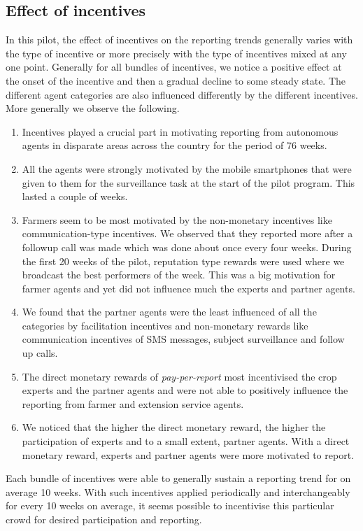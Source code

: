 \documentclass[letterpaper]{article} %
\begin{document}
\subsection{Effect of incentives}
In this pilot, the effect of incentives on the reporting trends generally varies with the type of incentive or more precisely with the type of incentives mixed at any one point. Generally for all bundles of incentives, we notice a positive effect at the onset of the incentive and then a gradual decline to some steady state. The different agent categories are also influenced differently by the different incentives. More generally we observe the following.
\begin{enumerate}
\item Incentives played a crucial part in motivating reporting from autonomous agents in disparate areas across the country for the period of 76 weeks.
\item All the agents were strongly motivated by the mobile smartphones that were given to them for the surveillance task at the start of the pilot program. This lasted a couple of weeks.
\item Farmers seem to be most motivated by the non-monetary incentives like communication-type incentives. We observed that they reported more after a followup call was made which was done about once every four weeks. During the first 20 weeks of the pilot, reputation type rewards were used where we broadcast the best performers of the week. This was a big motivation for farmer agents and yet did not influence much the experts and partner agents.
\item We found that the partner agents were the least influenced of all the categories by facilitation incentives and non-monetary rewards like communication incentives of SMS messages, subject surveillance and follow up calls.
\item The direct monetary rewards of \emph{pay-per-report} most incentivised the crop experts and the partner agents and were not able to positively influence the reporting from farmer and extension service agents.
\item We noticed that the higher the direct monetary reward, the higher the participation of experts and to a small extent, partner agents. With a direct monetary reward, experts and partner agents were more motivated to report.
\end{enumerate}

Each bundle of incentives were able to generally sustain a reporting trend for on average 10 weeks. With such incentives applied periodically and interchangeably for every 10 weeks on average, it seems possible to incentivise this particular crowd for desired participation and reporting.
\end{document}

